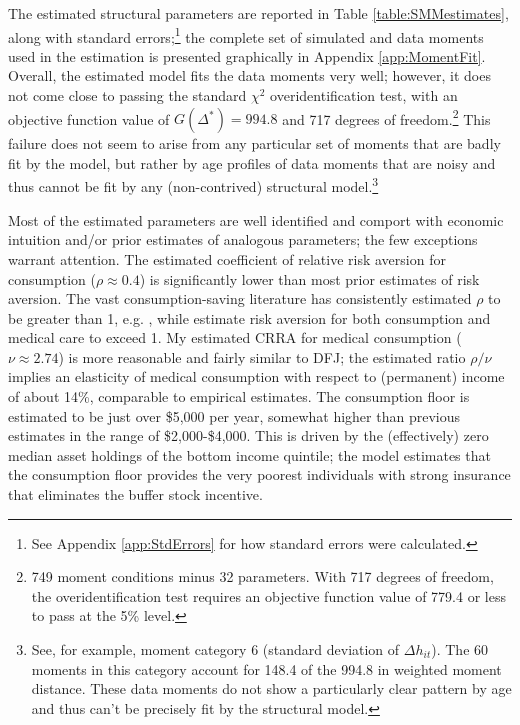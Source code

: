 \documentclass[12pt,pdftex,letterpaper]{article}
\newcommand{\Health}{h}
\newcommand{\CRRAcon}{\rho}
\newcommand{\CRRAcare}{\nu}
\begin{document}
The estimated structural parameters are reported in Table \ref{table:SMMestimates}, along with standard errors;\footnote{See Appendix \ref{app:StdErrors} for how standard errors were calculated.} the complete set of simulated and data moments used in the estimation is presented graphically in Appendix \ref{app:MomentFit}.  Overall, the estimated model fits the data moments very well; however, it does not come close to passing the standard $\chi^2$ overidentification test, with an objective function value of $G(\Delta^*) = 994.8$ and 717 degrees of freedom.\footnote{749 moment conditions minus 32 parameters.  With 717 degrees of freedom, the overidentification test requires an objective function value of 779.4 or less to pass at the 5\% level.}  This failure does not seem to arise from any particular set of moments that are badly fit by the model, but rather by age profiles of data moments that are noisy and thus cannot be fit by any (non-contrived) structural model.\footnote{See, for example, moment category 6 (standard deviation of $\Delta \Health_{it}$).  The 60 moments in this category account for 148.4 of the 994.8 in weighted moment distance. These data moments do not show a particularly clear pattern by age and thus can't be precisely fit by the structural model.}

Most of the estimated parameters are well identified and comport with economic intuition and/or prior estimates of analogous parameters; the few exceptions warrant attention.  The estimated coefficient of relative risk aversion for consumption ($\CRRAcon \approx 0.4$) is significantly lower than most prior estimates of risk aversion.  The vast consumption-saving literature has consistently estimated $\CRRAcon$ to be greater than 1, e.g. \cite{cagetti03}, while \cite{dinardi10} estimate risk aversion for both consumption and medical care to exceed 1.  My estimated CRRA for medical consumption ($\CRRAcare \approx 2.74$) is more reasonable and fairly similar to DFJ; the estimated ratio $\CRRAcon/\CRRAcare$ implies an elasticity of medical consumption with respect to (permanent) income of about 14\%, comparable to empirical estimates.  The consumption floor is estimated to be just over \$5,000 per year, somewhat higher than previous estimates in the range of \$2,000-\$4,000.  This is driven by the (effectively) zero median asset holdings of the bottom income quintile; the model estimates that the consumption floor provides the very poorest individuals with strong insurance that eliminates the buffer stock incentive.
\end{document}
